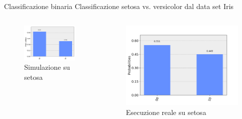 \documentclass{beamer}
\begin{document}
    \begin{frame}{Classificazione binaria}
        Classificazione setosa vs. versicolor dal data set Iris
        \begin{columns}
            \begin{figure}[h]
                \centering
                \includegraphics[width=\textwidth]{gfx/iris/iris2SetosaVersicolorResult.png}
                \caption{Simulazione su setosa}
                \label{fig:simulazione.setosa}
            \end{figure}
            \begin{figure}[h]
                \centering
                \includegraphics[width=\textwidth]{gfx/misura_setosa_sperimentale.png}
                \caption{Esecuzione reale su setosa}
                \label{fig:esecuzione.setosa}
            \end{figure}
        \end{columns}
    \end{frame}
\end{document}
